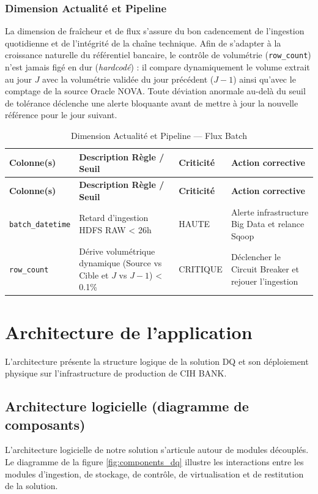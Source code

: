 \subsubsection{Dimension Actualité et Pipeline}
La dimension de fraîcheur et de flux s'assure du bon cadencement de l'ingestion quotidienne et de l'intégrité de la chaîne technique. Afin de s'adapter à la croissance naturelle du référentiel bancaire, le contrôle de volumétrie (\texttt{row\_count}) n'est jamais figé en dur (\textit{hardcodé}) : il compare dynamiquement le volume extrait au jour $J$ avec la volumétrie validée du jour précédent ($J-1$) ainsi qu'avec le comptage de la source Oracle NOVA. Toute déviation anormale au-delà du seuil de tolérance déclenche une alerte bloquante avant de mettre à jour la nouvelle référence pour le jour suivant.

\begin{longtable}{|p{}|p{}|p{}|p{}|}
\caption{Dimension Actualité et Pipeline — Flux Batch} \label{tab:regles_fraicheur} \\
\hline
\rowcolor{gray!20}
\textbf{Colonne(s)} & \textbf{Description Règle / Seuil} & \textbf{Criticité} & \textbf{Action corrective} \\
\hline
\endfirsthead
\hline
\rowcolor{gray!20}
\textbf{Colonne(s)} & \textbf{Description Règle / Seuil} & \textbf{Criticité} & \textbf{Action corrective} \\
\hline
\endhead
\texttt{batch\_}\allowbreak\texttt{datetime} & Retard d'ingestion HDFS RAW < 26h & HAUTE & Alerte infrastructure Big Data et relance Sqoop \\
\hline
\texttt{row\_count} & Dérive volumétrique dynamique (Source vs Cible et $J$ vs $J-1$) < 0.1\% & CRITIQUE & Déclencher le Circuit Breaker et rejouer l'ingestion \\
\hline
\end{longtable}

\section{Architecture de l'application}

L'architecture présente la structure logique de la solution DQ et son déploiement physique sur l'infrastructure de production de CIH BANK.

\subsection{Architecture logicielle (diagramme de composants)}
L'architecture logicielle de notre solution s'articule autour de modules découplés. Le diagramme de la figure \ref{fig:components_dq} illustre les interactions entre les modules d'ingestion, de stockage, de contrôle, de virtualisation et de restitution de la solution.

